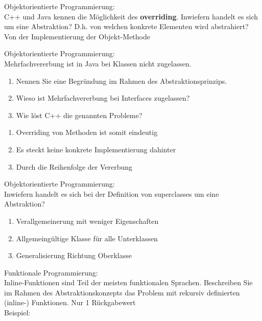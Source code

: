 \begin{card}
	Objektorientierte Programmierung:\\
	C++ und Java kennen die Möglichkeit des \textbf{overriding}. Inwiefern handelt es sich um eine Abstraktion? D.h. von welchen konkrete Elementen wird abstrahiert? 
	\hr
	Von der Implementierung der Objekt-Methode
\end{card}

\begin{card}
	Objektorientierte Programmierung:\\
	Mehrfachvererbung ist in Java bei Klassen nicht zugelassen. 
	\begin{enumerate}
	\item Nennen Sie eine Begründung im Rahmen des Abstraktionsprinzips.
	\item Wieso ist Mehrfachvererbung bei Interfaces zugelassen?
	\item Wie löst C++ die genannten Probleme?
	\end{enumerate}
	\hr
	\begin{enumerate}
	\item Overriding von Methoden ist somit eindeutig
	\item Es steckt keine konkrete Implementierung dahinter
	\item Durch die Reihenfolge der Vererbung
	\end{enumerate}
\end{card}

\begin{card}
	Objektorientierte Programmierung:\\
	Inwiefern handelt es sich bei der Definition von superclasses um eine Abstraktion?
	\hr
	\begin{enumerate}
	\item Verallgemeinerung mit weniger Eigenschaften
	\item Allgemeingültige Klasse für alle Unterklassen
	\item Generalisierung Richtung Oberklasse
	\end{enumerate}
\end{card}

\begin{card}
	Funktionale Programmierung:\\
	Inline-Funktionen sind Teil der meisten funktionalen Sprachen. Beschreiben Sie im Rahmen des Abstraktionskonzepts das Problem mit rekursiv definierten (inline-) Funktionen.
	\hr
	Nur 1 Rückgabewert\\
	Beispiel:
\end{card}

